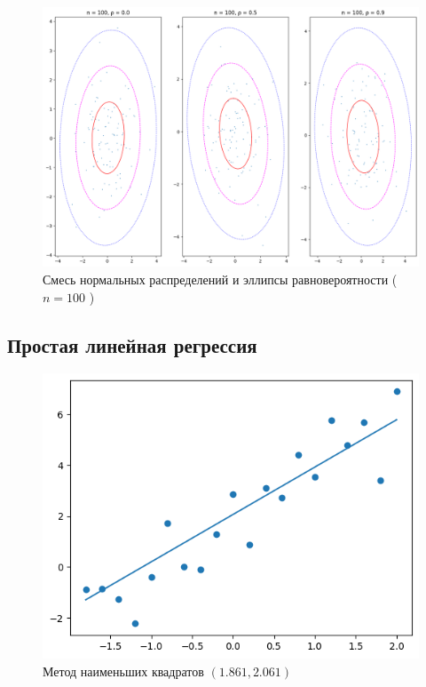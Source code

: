 \documentclass[12pt,a4paper]{article}
\begin{document}
	\begin{figure}[htbp!]
		\begin{center}
			\includegraphics[width = 0.8\linewidth]{graphics/lab5_ellips_100}
			\caption{Смесь нормальных распределений и эллипсы равновероятности
			( \( n = 100 \) )}
		\end{center}
	\end{figure}

	\clearpage

	\subsection{Простая линейная регрессия}

	\begin{figure}[htbp!]
		\begin{center}
			\includegraphics[width = 1\linewidth]{graphics/lab6_sq.png}
			\caption{Метод наименьших квадратов \( ( 1.861, 2.061) \)}
		\end{center}
	\end{figure}
\end{document}
